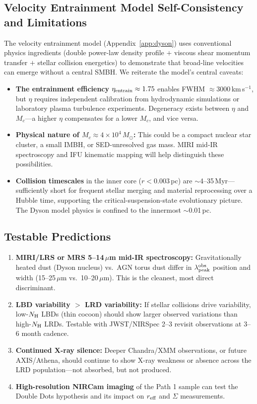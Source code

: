 \documentclass[twocolumn,linenumbers]{aastex631}
\begin{document}
\subsection{Velocity Entrainment Model Self-Consistency and Limitations}

The velocity entrainment model (Appendix~\ref{app:dyson}) uses conventional physics ingredients (double power-law density profile $+$ viscous shear momentum transfer $+$ stellar collision energetics) to demonstrate that broad-line velocities can emerge without a central SMBH. We reiterate the model's central caveats:

\begin{itemize}
\item \textbf{The entrainment efficiency $\eta_{\rm entrain} \approx 1.75$} enables FWHM $\approx 3000$\,km\,s$^{-1}$, but $\eta$ requires independent calibration from hydrodynamic simulations or laboratory plasma turbulence experiments. Degeneracy exists between $\eta$ and $M_c$---a higher $\eta$ compensates for a lower $M_c$, and vice versa.
\item \textbf{Physical nature of $M_c \approx 4 \times 10^4\,M_\odot$:} This could be a compact nuclear star cluster, a small IMBH, or SED-unresolved gas mass. MIRI mid-IR spectroscopy and IFU kinematic mapping will help distinguish these possibilities.
\item \textbf{Collision timescales} in the inner core ($r < 0.003$\,pc) are $\sim$4--35\,Myr---sufficiently short for frequent stellar merging and material reprocessing over a Hubble time, supporting the critical-suspension-state evolutionary picture. The Dyson model physics is confined to the innermost $\sim$0.01\,pc.
\end{itemize}

\subsection{Testable Predictions}

\begin{enumerate}
\item \textbf{MIRI/LRS or MRS 5--14\,$\mu$m mid-IR spectroscopy:} Gravitationally heated dust (Dyson nucleus) vs.\ AGN torus dust differ in $\lambda_{\rm peak}^{\rm obs}$ position and width (15--25\,$\mu$m vs.\ 10--20\,$\mu$m). This is the cleanest, most direct discriminant.
\item \textbf{LBD variability $>$ LRD variability:} If stellar collisions drive variability, low-$N_{\rm H}$ LBDs (thin cocoon) should show larger observed variations than high-$N_{\rm H}$ LRDs. Testable with JWST/NIRSpec 2--3 revisit observations at 3--6 month cadence.
\item \textbf{Continued X-ray silence:} Deeper Chandra/XMM observations, or future AXIS/Athena, should continue to show X-ray weakness or absence across the LRD population---not absorbed, but not produced.
\item \textbf{High-resolution NIRCam imaging} of the Path 1 sample can test the Double Dots hypothesis and its impact on $r_{\rm eff}$ and $\Sigma$ measurements.
\end{enumerate}
\end{document}

